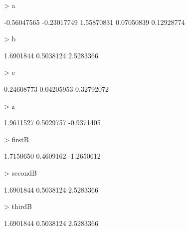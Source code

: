 \documentclass[11pt]{article}
\begin{document}
\begin{Schunk}
\begin{Sinput}
> a
\end{Sinput}
\begin{Soutput}
[1] -0.56047565 -0.23017749  1.55870831  0.07050839  0.12928774
\end{Soutput}
\begin{Sinput}
> b
\end{Sinput}
\begin{Soutput}
[1] 1.6901844 0.5038124 2.5283366
\end{Soutput}
\begin{Sinput}
> c
\end{Sinput}
\begin{Soutput}
[1] 0.24608773 0.04205953 0.32792072
\end{Soutput}
\begin{Sinput}
> z
\end{Sinput}
\begin{Soutput}
[1]  1.9611527  0.5029757 -0.9371405
\end{Soutput}
\begin{Sinput}
> firstB
\end{Sinput}
\begin{Soutput}
[1]  1.7150650  0.4609162 -1.2650612
\end{Soutput}
\begin{Sinput}
> secondB
\end{Sinput}
\begin{Soutput}
[1] 1.6901844 0.5038124 2.5283366
\end{Soutput}
\begin{Sinput}
> thirdB
\end{Sinput}
\begin{Soutput}
[1] 1.6901844 0.5038124 2.5283366
\end{Soutput}
\end{Schunk}
\end{document}
